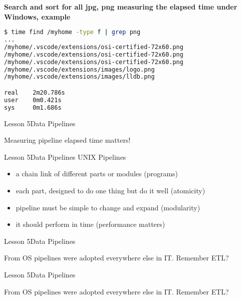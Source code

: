 \documentclass[aspectratio=1610]{beamer}
\begin{document}
\begin{frame}[fragile]
\LARGE
\textbf{Search and sort for all jpg, png measuring the elapsed time under Windows, example}\\
\Large
\begin{lstlisting}[language=sh]
$ time find /myhome -type f | grep png
...
/myhome/.vscode/extensions/osi-certified-72x60.png
/myhome/.vscode/extensions/osi-certified-72x60.png
/myhome/.vscode/extensions/osi-certified-72x60.png
/myhome/.vscode/extensions/images/logo.png
/myhome/.vscode/extensions/images/lldb.png

real    2m20.786s
user    0m0.421s
sys     0m1.686s

\end{lstlisting}
\end{frame}


\begin{frame}{Lesson 5}{Data Pipelines}
\Huge
\begin{center}
Measuring pipeline elapsed time matters!
\end{center}
\end{frame}


\begin{frame}{Lesson 5}{Data Pipelines}
\LARGE
UNIX Pipelines
\begin{itemize}
    \item a chain link of different parts or modules (programs)
    \item each part, designed to do one thing but do it well (atomicity)
    \item pipeline must be simple to change and expand (modularity)
    \item it should perform in time (performance matters)
\end{itemize}
\end{frame}


\begin{frame}{Lesson 5}{Data Pipelines}
\Huge
\begin{center}
From OS pipelines were adopted everywhere else in IT. Remember ETL?
\end{center}
\end{frame}



\begin{frame}{Lesson 5}{Data Pipelines}
\Huge
\begin{center}
From OS pipelines were adopted everywhere else in IT. Remember \alert{ETL}?
\end{center}
\end{frame}
\end{document}
